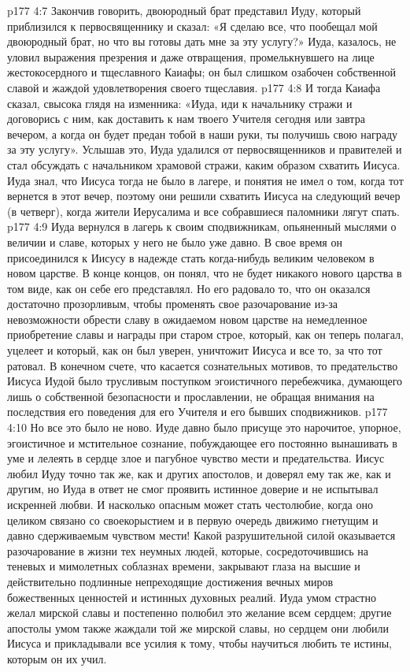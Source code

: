 \vs p177 4:7 Закончив говорить, двоюродный брат представил Иуду, который приблизился к первосвященнику и сказал: «Я сделаю все, что пообещал мой двоюродный брат, но что вы готовы дать мне за эту услугу?» Иуда, казалось, не уловил выражения презрения и даже отвращения, промелькнувшего на лице жестокосердного и тщеславного Каиафы; он был слишком озабочен собственной славой и жаждой удовлетворения своего тщеславия.
\vs p177 4:8 И тогда Каиафа сказал, свысока глядя на изменника: «Иуда, иди к начальнику стражи и договорись с ним, как доставить к нам твоего Учителя сегодня или завтра вечером, а когда он будет предан тобой в наши руки, ты получишь свою награду за эту услугу». Услышав это, Иуда удалился от первосвященников и правителей и стал обсуждать с начальником храмовой стражи, каким образом схватить Иисуса. Иуда знал, что Иисуса тогда не было в лагере, и понятия не имел о том, когда тот вернется в этот вечер, поэтому они решили схватить Иисуса на следующий вечер (в четверг), когда жители Иерусалима и все собравшиеся паломники лягут спать.
\vs p177 4:9 Иуда вернулся в лагерь к своим сподвижникам, опьяненный мыслями о величии и славе, которых у него не было уже давно. В свое время он присоединился к Иисусу в надежде стать когда\hyp{}нибудь великим человеком в новом царстве. В конце концов, он понял, что не будет никакого нового царства в том виде, как он себе его представлял. Но его радовало то, что он оказался достаточно прозорливым, чтобы променять свое разочарование из\hyp{}за невозможности обрести славу в ожидаемом новом царстве на немедленное приобретение славы и награды при старом строе, который, как он теперь полагал, уцелеет и который, как он был уверен, уничтожит Иисуса и все то, за что тот ратовал. В конечном счете, что касается сознательных мотивов, то предательство Иисуса Иудой было трусливым поступком эгоистичного перебежчика, думающего лишь о собственной безопасности и прославлении, не обращая внимания на последствия его поведения для его Учителя и его бывших сподвижников.
\vs p177 4:10 Но все это было не ново. Иуде давно было присуще это нарочитое, упорное, эгоистичное и мстительное сознание, побуждающее его постоянно вынашивать в уме и лелеять в сердце злое и пагубное чувство мести и предательства. Иисус любил Иуду точно так же, как и других апостолов, и доверял ему так же, как и другим, но Иуда в ответ не смог проявить истинное доверие и не испытывал искренней любви. И насколько опасным может стать честолюбие, когда оно целиком связано со своекорыстием и в первую очередь движимо гнетущим и давно сдерживаемым чувством мести! Какой разрушительной силой оказывается разочарование в жизни тех неумных людей, которые, сосредоточившись на теневых и мимолетных соблазнах времени, закрывают глаза на высшие и действительно подлинные непреходящие достижения вечных миров божественных ценностей и истинных духовных реалий. Иуда умом страстно желал мирской славы и постепенно полюбил это желание всем сердцем; другие апостолы умом также жаждали той же мирской славы, но сердцем они любили Иисуса и прикладывали все усилия к тому, чтобы научиться любить те истины, которым он их учил.
